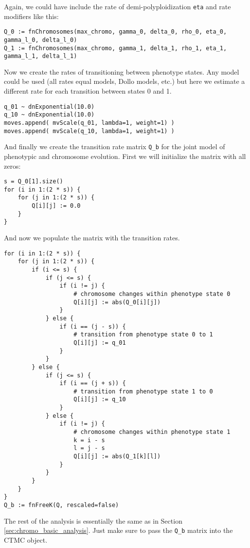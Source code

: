 Again, we could have include the rate of demi-polyploidization \texttt{eta}
and rate modifiers like this:
{\tt \begin{snugshade*}
\begin{lstlisting}
Q_0 := fnChromosomes(max_chromo, gamma_0, delta_0, rho_0, eta_0, gamma_l_0, delta_l_0) 
Q_1 := fnChromosomes(max_chromo, gamma_1, delta_1, rho_1, eta_1, gamma_l_1, delta_l_1) 
\end{lstlisting}
\end{snugshade*}}
Now we create the rates of transitioning between phenotype states.
Any model could be used (all rates equal models, Dollo models, etc.)
but here we estimate a different rate for each transition between states 0 and 1.
{\tt \begin{snugshade*}
\begin{lstlisting}
q_01 ~ dnExponential(10.0)
q_10 ~ dnExponential(10.0)
moves.append( mvScale(q_01, lambda=1, weight=1) )
moves.append( mvScale(q_10, lambda=1, weight=1) )
\end{lstlisting}
\end{snugshade*}}
And finally we create the transition rate matrix \texttt{Q\_b} 
for the joint model of phenotypic and chromosome evolution.
First we will initialize the matrix with all zeros:
{\tt \begin{snugshade*}
\begin{lstlisting}
s = Q_0[1].size()
for (i in 1:(2 * s)) {
    for (j in 1:(2 * s)) {
        Q[i][j] := 0.0
    }
}
\end{lstlisting}
\end{snugshade*}}
And now we populate the matrix with the transition rates.
{\tt \begin{snugshade*}
\begin{lstlisting}
for (i in 1:(2 * s)) {
    for (j in 1:(2 * s)) {
        if (i <= s) {
            if (j <= s) {
                if (i != j) {
                    # chromosome changes within phenotype state 0
                    Q[i][j] := abs(Q_0[i][j])
                }
            } else {
                if (i == (j - s)) {
                    # transition from phenotype state 0 to 1
                    Q[i][j] := q_01
                }
            }
        } else {
            if (j <= s) {
                if (i == (j + s)) {
                    # transition from phenotype state 1 to 0
                    Q[i][j] := q_10
                }
            } else {
                if (i != j) {
                    # chromosome changes within phenotype state 1
                    k = i - s
                    l = j - s
                    Q[i][j] := abs(Q_1[k][l])
                }
            }
        }
    }
}
Q_b := fnFreeK(Q, rescaled=false)
\end{lstlisting}
\end{snugshade*}}
The rest of the analysis is essentially
the same as in Section \ref{sec:chromo_basic_analysis}. Just make sure
to pass the \texttt{Q\_b} matrix into the CTMC object.

